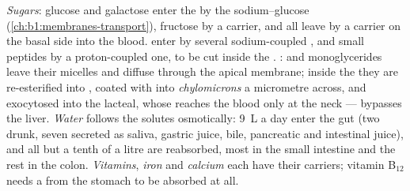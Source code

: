 \begin{proposition}\label{prop:b1:digestion-absorption:routes}
\emph{Sugars}: glucose and galactose enter the  by the
sodium--glucose  (\cref{ch:b1:membranes-transport}), fructose
by a carrier, and all leave by a carrier on the basal side into the
blood. \emph{} enter by several sodium-coupled ,
and small peptides by a proton-coupled one, to be cut inside the .
\emph{}:  and monoglycerides leave their micelles and
diffuse through the apical membrane; inside the  they are
re-esterified into , coated with  into
\emph{chylomicrons} a micrometre across, and exocytosed into the
lacteal, whose  reaches the blood only at the neck ---  bypasses
the liver. \emph{Water} follows the solutes osmotically:
\qty{9}{L} a day enter the gut (two drunk, seven secreted as saliva,
gastric juice, bile, pancreatic and intestinal juice), and all but a
tenth of a litre are reabsorbed, most in the small intestine and the
rest in the colon. \emph{Vitamins}, \emph{iron} and \emph{calcium}
each have their carriers; vitamin B$_{12}$ needs a  from the
stomach to be absorbed at all.
\end{proposition}

